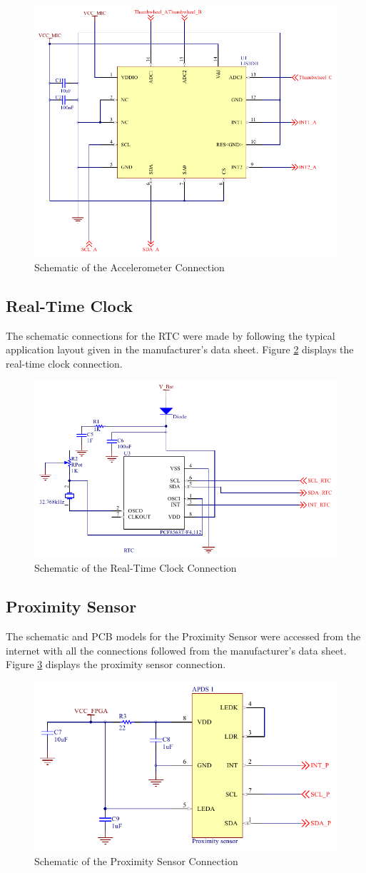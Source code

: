 \begin{figure}
	\includegraphics[width=0.5\linewidth]{Figures/accelerometer.pdf}\centering
	\caption{Schematic of the Accelerometer Connection}
	\label{fig:a}
\end{figure}

\subsection{Real-Time Clock}
\label{chap:RTC}

	The schematic connections for the RTC were made by following the typical application layout given in the manufacturer's data sheet.
Figure \ref{fig:RTC} displays the real-time clock connection. 

\begin{figure}
	\includegraphics[width=0.5\linewidth]{Figures/RTC.pdf}\centering
	\caption{Schematic of the Real-Time Clock Connection}
	\label{fig:RTC}
\end{figure}

\subsection{Proximity Sensor}
\label{chap:prox}
	The schematic and PCB models for the Proximity Sensor were accessed from the internet with all the connections followed from the manufacturer's data sheet. 
Figure \ref{fig:prox} displays the proximity sensor connection. 

\begin{figure}
	\includegraphics[width=0.5\linewidth]{Figures/prox_sensor.pdf}\centering
	\caption{Schematic of the Proximity Sensor Connection}
	\label{fig:prox}
\end{figure}

